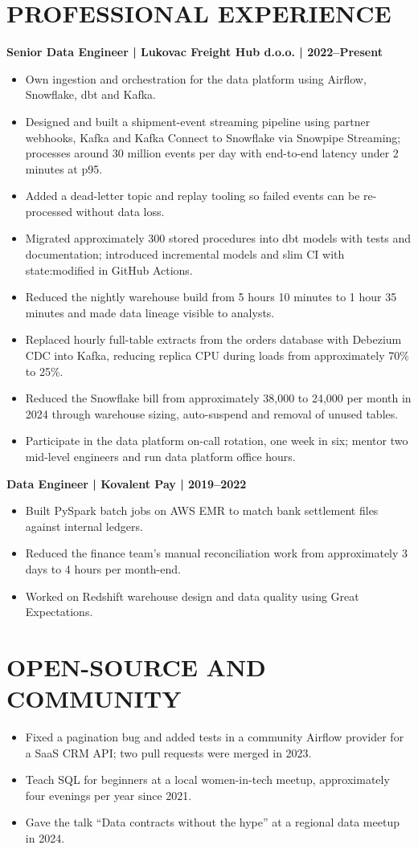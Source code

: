 \documentclass[11pt,a4paper]{article}
\begin{document}
\section*{PROFESSIONAL EXPERIENCE}
\noindent\textbf{Senior Data Engineer | Lukovac Freight Hub d.o.o. | 2022–Present}
\begin{itemize}
\item Own ingestion and orchestration for the data platform using Airflow, Snowflake, dbt and Kafka.
\item Designed and built a shipment-event streaming pipeline using partner webhooks, Kafka and Kafka Connect to Snowflake via Snowpipe Streaming; processes around 30 million events per day with end-to-end latency under 2 minutes at p95.
\item Added a dead-letter topic and replay tooling so failed events can be re-processed without data loss.
\item Migrated approximately 300 stored procedures into dbt models with tests and documentation; introduced incremental models and slim CI with state:modified in GitHub Actions.
\item Reduced the nightly warehouse build from 5 hours 10 minutes to 1 hour 35 minutes and made data lineage visible to analysts.
\item Replaced hourly full-table extracts from the orders database with Debezium CDC into Kafka, reducing replica CPU during loads from approximately 70\% to 25\%.
\item Reduced the Snowflake bill from approximately 38,000 to 24,000 per month in 2024 through warehouse sizing, auto-suspend and removal of unused tables.
\item Participate in the data platform on-call rotation, one week in six; mentor two mid-level engineers and run data platform office hours.
\end{itemize}
\noindent\textbf{Data Engineer | Kovalent Pay | 2019–2022}
\begin{itemize}
\item Built PySpark batch jobs on AWS EMR to match bank settlement files against internal ledgers.
\item Reduced the finance team's manual reconciliation work from approximately 3 days to 4 hours per month-end.
\item Worked on Redshift warehouse design and data quality using Great Expectations.
\end{itemize}

\section*{OPEN-SOURCE AND COMMUNITY}
\begin{itemize}
\item Fixed a pagination bug and added tests in a community Airflow provider for a SaaS CRM API; two pull requests were merged in 2023.
\item Teach SQL for beginners at a local women-in-tech meetup, approximately four evenings per year since 2021.
\item Gave the talk “Data contracts without the hype” at a regional data meetup in 2024.
\end{itemize}
\end{document}
